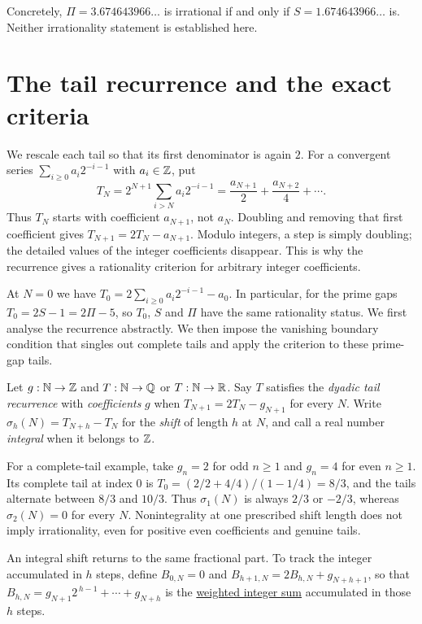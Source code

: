 \documentclass[11pt]{article}
\makeatletter
\newcommand{\compatlabel}[1]{\ltx@label{#1}}
\makeatother
\begin{document}
Concretely, $\Pi=3.674643966\ldots$ is irrational
if and only if $S=1.674643966\ldots$ is.  Neither irrationality statement is established here.

\section{The tail recurrence and the exact criteria}\label{long251:sec:tail}

We rescale each tail so that its first denominator is again $2$.
For a convergent series $\sum_{i\ge0}a_i2^{-i-1}$ with $a_i\in\mathbb{Z}$,
put
\[
 T_N=2^{N+1}\sum_{i>N}a_i2^{-i-1}
    =\frac{a_{N+1}}2+\frac{a_{N+2}}4+\cdots.
\]
Thus $T_N$ starts with coefficient $a_{N+1}$, not $a_N$.  Doubling
and removing that first coefficient gives
$T_{N+1}=2T_N-a_{N+1}$.  Modulo integers, a step is simply doubling;
the detailed values of the integer coefficients disappear.  This is
why the recurrence gives a rationality criterion for arbitrary integer
coefficients.

At $N=0$ we have
$T_0=2\sum_{i\ge0}a_i2^{-i-1}-a_0$.  In particular, for the prime
gaps $T_0=2S-1=2\Pi-5$, so $T_0$, $S$ and $\Pi$ have the same
rationality status.  We first analyse the recurrence abstractly.
We then impose the vanishing boundary condition that singles out
complete tails and apply the criterion to these prime-gap tails.

\begin{definition}\label{long251:def:rec}\compatlabel{def:rec}
Let $g:\mathbb{N}\to\mathbb{Z}$ and $T:\mathbb{N}\to\mathbb{Q}$ or $T:\mathbb{N}\to\mathbb{R}$.  Say $T$ satisfies the
\emph{dyadic tail recurrence} with \emph{coefficients} $g$ when
$T_{N+1}=2T_N-g_{N+1}$ for every $N$.  Write $\sigma_h(N)=T_{N+h}-T_N$ for the
\emph{shift} of length $h$ at $N$, and call a real number \emph{integral}
when it belongs to $\mathbb{Z}$.
\end{definition}

For a complete-tail example, take $g_n=2$ for odd $n\ge1$ and $g_n=4$
for even $n\ge1$.  Its complete tail at index $0$ is
$T_0=(2/2+4/4)/(1-1/4)=8/3$, and the tails alternate between
$8/3$ and $10/3$.  Thus $\sigma_1(N)$ is always $2/3$ or $-2/3$,
whereas $\sigma_2(N)=0$ for every $N$.  Nonintegrality at one prescribed
shift length does not imply irrationality, even for positive even
coefficients and genuine tails.

An integral shift returns to the same fractional part.  To track the
integer accumulated in $h$ steps, define $B_{0,N}=0$ and
$B_{h+1,N}=2B_{h,N}+g_{N+h+1}$,
so that $B_{h,N}=g_{N+1}2^{\,h-1}+\cdots+g_{N+h}$ is the
\href{https://github.com/wcook04/plectis-erdos/blob/3d6d938d696fed0fb71dd55115a18a73738ff223/lean/ErdosProblems/Erdos251/PrimeGapDyadicTail.lean\#L647}{weighted integer sum}
accumulated in those $h$ steps.
\end{document}
